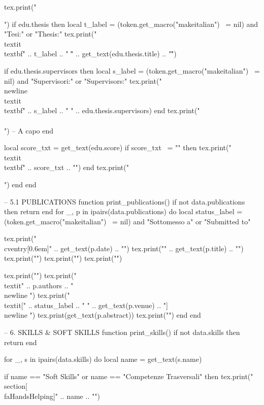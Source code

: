 \begin{luacode*}
    tex.print("{")
    if edu.thesis then
    local t_label = (token.get_macro("makeitalian") ~= nil) and "Tesi:" or "Thesis:"
    tex.print("\\textit{\\textbf{" .. t_label .. "}} \"" .. get_text(edu.thesis.title) .. "\"")

    if edu.thesis.supervisors then
    local s_label = (token.get_macro("makeitalian") ~= nil) and "Supervisori:" or "Supervisors:"
    tex.print("\\newline \\textit{\\textbf{" .. s_label .. "}} " .. edu.thesis.supervisors)
    end
    tex.print("\\\\") -- A capo
    end

    local score_txt = get_text(edu.score)
    if score_txt ~= "" then
    tex.print("\\textit{\\textbf{" .. score_txt .. "}}")
    end
    tex.print("}")
    end
    end

    -- 5.1 PUBLICATIONS
    function print_publications()
    if not data.publications then return end
    for _, p in ipairs(data.publications) do
    local status_label = (token.get_macro("makeitalian") ~= nil) and "Sottomesso a" or "Submitted to"

    tex.print("\\cventry[0.6em]{" .. get_text(p.date) .. "}")
    tex.print("{" .. get_text(p.title) .. "}")
    tex.print("{}")
    tex.print("{}")
    tex.print("{}")

    tex.print("{")
    tex.print("\\textit{" .. p.authors .. "} \\newline ")
    tex.print("\\textit{[" .. status_label .. " " .. get_text(p.venue) .. "]} \\newline ")
    tex.print(get_text(p.abstract))
    tex.print("}")
    end
    end

    -- 6. SKILLS & SOFT SKILLS
    function print_skills()
    if not data.skills then return end

    for _, s in ipairs(data.skills) do
    local name = get_text(s.name)

    if name == "Soft Skills" or name == "Competenze Trasversali" then
    tex.print("\\section[\\faHandsHelping]{" .. name .. "}")


\end{luacode*}
